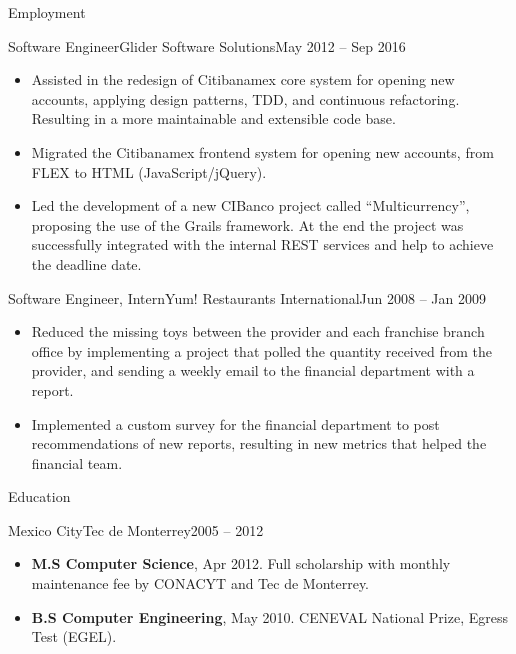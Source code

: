 \documentclass[calibri]{../macdowell-cv/mcdowellcv}
\begin{document}
\begin{cvsection}{Employment}
		\begin{cvsubsection}{Software Engineer}{Glider Software Solutions}{May 2012 -- Sep 2016}	
			\begin{itemize}
				\item Assisted in the redesign of Citibanamex core system for opening new accounts, applying design patterns, TDD, and continuous refactoring. Resulting in a more maintainable and extensible code base.
				\item Migrated the Citibanamex frontend system for opening new accounts, from FLEX to HTML (JavaScript/jQuery).
				\item Led the development of a new CIBanco project called ``Multicurrency'', proposing the use of the Grails framework. At the end the project was successfully integrated with the internal REST services and help to achieve the deadline date.
			\end{itemize}
		\end{cvsubsection}

		\begin{cvsubsection}{Software Engineer, Intern}{Yum! Restaurants International}{Jun 2008 -- Jan 2009}
			\begin{itemize}
				\item Reduced the missing toys between the provider and each franchise branch office by implementing a project that polled the quantity received from the provider, and sending a weekly email to the financial department with a report.
				\item Implemented a custom survey for the financial department to post recommendations of new reports, resulting in new metrics that helped the financial team.
			\end{itemize}
		\end{cvsubsection}
	\end{cvsection}
	
	\begin{cvsection}{Education}
		\begin{cvsubsection}{Mexico City}{Tec de Monterrey}{2005 -- 2012}
			\begin{itemize}
				\item \textbf{M.S Computer Science}, Apr 2012. Full scholarship with monthly maintenance fee by CONACYT and Tec de Monterrey.
				\item \textbf{B.S Computer Engineering}, May 2010. CENEVAL National Prize, Egress Test (EGEL).
			\end{itemize}
		\end{cvsubsection}
	\end{cvsection}
	
\end{document}
